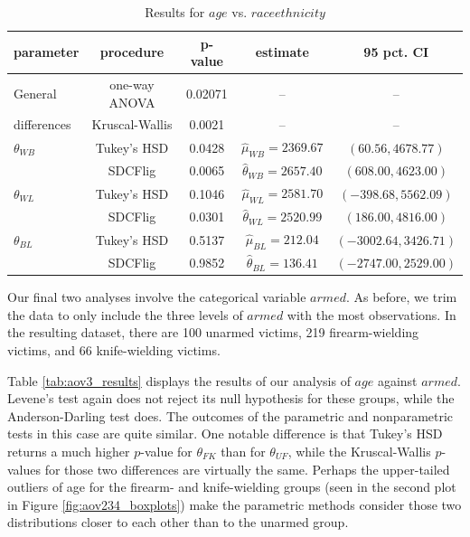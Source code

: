 \begin{table}[h]
    \centering
    \begin{tabular}{|l|c|c|c|c|}
        \hline
        \textbf{parameter} & \textbf{procedure} & \textbf{p-value} & \textbf{estimate} & \textbf{95 pct. CI}\\
        \hline
        General & one-way ANOVA & 0.02071 & -- & --\\
        differences & Kruscal-Wallis & 0.0021  & -- & --\\
        \hline
        $\theta_{WB}$ & Tukey's HSD & 0.0428 & $\hat{\mu}_{WB} = 2369.67$ & $(60.56, 4678.77)$\\
        & SDCFlig & 0.0065 & $\hat{\theta}_{WB} = 2657.40$ & $(608.00, 4623.00)$\\
        \hline
        $\theta_{WL}$ & Tukey's HSD & 0.1046 & $\hat{\mu}_{WL} = 2581.70$ & $(-398.68, 5562.09)$\\
        & SDCFlig & 0.0301 & $\hat{\theta}_{WL} = 2520.99$ & $(186.00, 4816.00)$\\
        \hline
        $\theta_{BL}$ & Tukey's HSD & 0.5137 & $\hat{\mu}_{BL} = 212.04$ & $(-3002.64, 3426.71)$\\
        & SDCFlig & 0.9852 & $\hat{\theta}_{BL} = 136.41$ & $(-2747.00, 2529.00)$\\
        \hline
    \end{tabular}
    \caption{Results for $age$ vs. $raceethnicity$}
    \label{tab:aov2_results}
\end{table}

\newpage

\par Our final two analyses involve the categorical variable $armed$. As before, we trim the data to only include the three levels of $armed$ with the most observations. In the resulting dataset, there are 100 unarmed victims, 219 firearm-wielding victims, and 66 knife-wielding victims.

\par \bigskip Table \ref{tab:aov3_results} displays the results of our analysis of $age$ against $armed$. Levene's test again does not reject its null hypothesis for these groups, while the Anderson-Darling test does. The outcomes of the parametric and nonparametric tests in this case are quite similar. One notable difference is that Tukey's HSD returns a much higher $p$-value for $\theta_{FK}$ than for $\theta_{UF}$, while the Kruscal-Wallis $p$-values for those two differences are virtually the same. Perhaps the upper-tailed outliers of age for the firearm- and knife-wielding groups (seen in the second plot in Figure \ref{fig:aov234_boxplots}) make the parametric methods consider those two distributions closer to each other than to the unarmed group.

